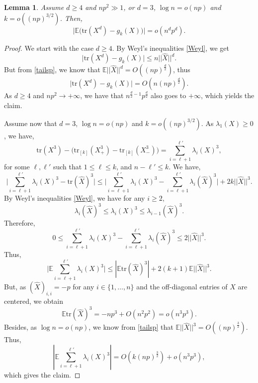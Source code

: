 \documentclass[aop,preprint]{imsart}
\newcommand\EE{\mathbb{E}}
\newcommand\tr{\mathrm{tr}}
\numberwithin{equation}{section}
\theoremstyle{definition}
\theoremstyle{plain}
\newtheorem{Lem}[Def]{Lemma}
\theoremstyle{remark}
\begin{document}
\begin{Lem}\label{expect}
Assume $d\geq 4$ and $np^2 \gg 1$, or $d=3$, $\log n =o(np)$ and $k =o((np)^{3/2})$. Then,
$$ \big| \EE \big(  \tr (X^d) - g_k(X)\big) \big| = o(n^dp^d).$$


\end{Lem}
\begin{proof}We start with the case $d\geq 4$. 
By Weyl's inequalities \eqref{Weyl}, we get
$$ \big|  \tr (X^d) - g_k(X) \big|\leq n || \hat X||^d.$$
But from \eqref{tailsp}, we know that $\EE ||\hat X||^d = O( (np)^{\frac{d}{2}})$, thus
$$ \big|  \tr (X^d) - g_k(X) \big|= O( n (np)^{\frac{d}{2}}).$$
As $d\geq 4$ and $np^2 \to +\infty$, we have that $n^{\frac{d}{2}-1}p^{\frac{d}{2}}$ also goes to $+\infty$, which yields the claim.

Assume now that $d=3$, $\log n =o(np)$ and $k =o((np)^{3/2})$. As $\lambda_1(X)\geq 0$, we have,
$$ \tr (X^3) - \big( \tr_{[k]} (X_+^3) - \tr_{[k]}( X_-^3) \big)= \sum_{i=\ell+1}^{\ell'} \lambda_i(X)^3,$$
for some $\ell,\ell'$ such that $1 \leq \ell\leq k$, and $n-\ell'\leq k$. We have,
 $$\big|  \sum_{i=\ell+1}^{\ell'} \lambda_i(X)^3- \tr (\hat X)^3 \big| \leq\big|\sum_{i=\ell+1}^{\ell'} \lambda_i(X)^3-   \sum_{i=\ell+1}^{\ell'} \lambda_i(\hat X)^3 \big| + 2k ||\hat X||^3.$$
By Weyl's inequalities \eqref{Weyl}, we have for any $i\geq 2$,
$$\lambda_i(\hat X)^3 \leq  \lambda_i(X)^3\leq   \lambda_{i-1}(\hat X)^3.$$
Therefore,
$$0\leq \sum_{i=\ell+1}^{\ell'} \lambda_i(X)^3-   \sum_{i=\ell+1}^{\ell'} \lambda_i(\hat X)^3 \leq 2|| \hat X||^3.$$
Thus,
$$\big|  \EE \sum_{i=\ell+1}^{\ell'} \lambda_i(X)^3\big| \leq  | \EE \tr (\hat X)^3| + 2(k+1)\EE || \hat X||^3.$$
But, as $(\hat X)_{i,i} =-p$ for any $i\in\{1,\ldots,n\}$ and the off-diagonal entries of $\hat X$ are centered, we obtain
$$\EE \tr (\hat X)^3 = -np^3 + O(n^2p^2)=o(n^3p^3).$$
Besides, as $\log n =o(np)$, we know from \eqref{tailsp} that $\EE || \hat X ||^3 = O((np)^{\frac{3}{2}})$. Thus,
$$| \EE  \sum_{i=\ell+1}^{\ell'} \lambda_i(X)^3| = O( k(np)^{\frac{3}{2}}) + o(n^3p^3),$$
which gives the claim.


\end{proof}
\end{document}
